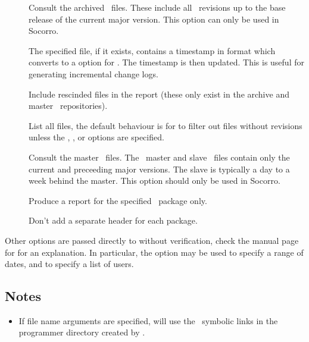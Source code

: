 \begin{description}
\item[]
   Consult the archived \rcs\ files.  These include all \rcs\ revisions up to
   the base release of the current major version.  This option can only be
   used in Socorro.

\item[]
   The specified file, if it exists, contains a timestamp in 
   format which  converts to a  option for
   .  The timestamp is then updated.  This is useful for
   generating incremental change logs.

\item[]
   Include rescinded files in the report (these only exist in the archive and
   master \rcs\ repositories).

\item[]
   List all files, the default behaviour is for  to filter out files
   without revisions unless the , , or  
   options are specified.

\item[]
   Consult the master \rcs\ files.  The \aipspp\ master and slave
   \rcs\ files contain only the current and preceeding major versions.  The
   slave is typically a day to a week behind the master.  This option should
   only be used in Socorro.

\item[]
   Produce a report for the specified \aipspp\ package only.

\item[]
   Don't add a separate header for each package.
\end{description}

Other options are passed directly to  without verification,
check the manual page for  for an explanation.  In particular,
the  option may be used to specify a range of dates, and  to
specify a list of users.

\subsection*{Notes}

\begin{itemize}
\item
   If file name arguments are specified,  will use the \rcs\ 
   symbolic links in the programmer directory created by .
\end{itemize}

